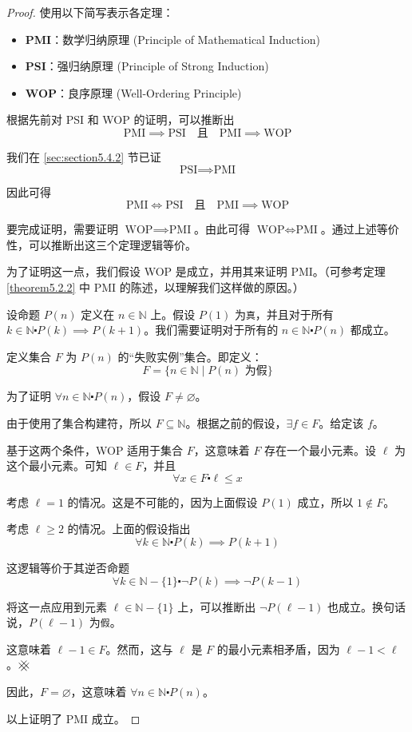 \begin{proof}
    使用以下简写表示各定理：
    \begin{itemize}
        \item \textbf{PMI}：数学归纳原理 (Principle of Mathematical Induction)
        \item \textbf{PSI}：强归纳原理 (Principle of Strong Induction)
        \item \textbf{WOP}：良序原理 (Well-Ordering Principle)
    \end{itemize}

    根据先前对 PSI 和 WOP 的证明，可以推断出
    \[\text{PMI} \implies \text{PSI} \quad\text{且}\quad \text{PMI} \implies \text{WOP}\]

    我们在 \ref{sec:section5.4.2} 节已证
    \[\text{PSI} \implies \text{PMI}\]

    因此可得
    \[\text{PMI} \iff \text{PSI} \quad\text{且}\quad \text{PMI} \implies \text{WOP}\]

    要完成证明，需要证明 $\text{WOP} \implies \text{PMI}$。由此可得 $\text{WOP} \iff \text{PMI}$。通过上述等价性，可以推断出这三个定理逻辑等价。

    为了证明这一点，我们假设 WOP 是成立，并用其来证明 PMI。（可参考定理 \ref{theorem5.2.2} 中 PMI 的陈述，以理解我们这样做的原因。）

    设命题 $P(n)$ 定义在 $n \in \mathbb{N}$ 上。假设 $P(1)$ 为\verb|真|，并且对于所有 $k \in \mathbb{N} \centerdot P(k) \implies P(k+1)$。我们需要证明对于所有的 $n \in \mathbb{N} \centerdot P(n)$ 都成立。

    定义集合 $F$ 为 $P(n)$ 的``失败实例''集合。即定义：
    \[F = \{n \in \mathbb{N} \mid P(n) \text{\ 为假}\}\]

    为了证明 $\forall n \in \mathbb{N} \centerdot P(n)$，假设 $F \ne \varnothing$。

    由于使用了集合构建符，所以 $F \subseteq \mathbb{N}$。根据之前的假设，$\exists f \in F$。给定该 $f$。

    基于这两个条件，WOP 适用于集合 $F$，这意味着 $F$ 存在一个最小元素。设 $\ell$ 为这个最小元素。可知 $\ell \in F$，并且
    \[\forall x \in F \centerdot \ell \le x\]

    考虑 $\ell = 1$ 的情况。这是不可能的，因为上面假设 $P(1)$ 成立，所以 $1 \notin F$。

    考虑 $\ell \ge 2$ 的情况。上面的假设指出
    \[\forall k \in \mathbb{N} \centerdot P(k) \implies P(k+1)\]

    这逻辑等价于其逆否命题
    \[\forall k \in \mathbb{N} - \{1\} \centerdot \neg P(k) \implies \neg P(k-1)\]

    将这一点应用到元素 $\ell \in \mathbb{N} - \{1\}$ 上，可以推断出 $\neg P(\ell - 1)$ 也成立。换句话说，$P(\ell-1)$ 为\verb|假|。

    这意味着 $\ell-1 \in F$。然而，这与 $\ell$ 是 $F$ 的最小元素相矛盾，因为 $\ell - 1 < \ell$。$\hashx$

    因此，$F = \varnothing$，这意味着 $\forall n \in \mathbb{N} \centerdot P(n)$。

    以上证明了 PMI 成立。
\end{proof}

